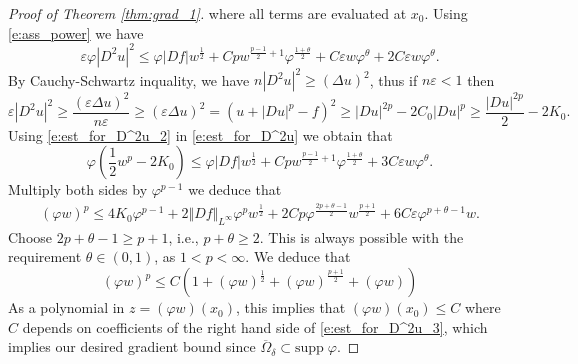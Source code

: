 \documentclass[11pt,reqno]{amsart}
\numberwithin{figure}{section}
\theoremstyle{plain}
\theoremstyle{remark}
\numberwithin{equation}{section}
\begin{document}
\begin{appendices}
\begin{proof}[Proof of Theorem \ref{thm:grad_1}]
where all terms are evaluated at $x_0$. Using \eqref{e:ass_power} we have
\begin{equation}\label{e:est_for_D^2u}
    \varepsilon \varphi|D^2u|^2 \leq  \varphi |Df|w^{\frac{1}{2}}+ Cp w^{\frac{p-1}{2}+1} \varphi^{\frac{1+\theta}{2}} + C\varepsilon w \varphi^{\theta} + 2C\varepsilon  w\varphi^\theta.
\end{equation}
By Cauchy-Schwartz inquality, we have $n|D^2u|^2\geq (\Delta u)^2$, thus if $n\varepsilon < 1$ then
\begin{equation}\label{e:est_for_D^2u_2}
    \varepsilon |D^2u|^2 \geq \frac{(\varepsilon \Delta u)^2}{n\varepsilon} \geq (\varepsilon \Delta u)^2 = \left(  u + |Du|^p - f\right)^2 \geq |Du|^{2p} - 2C_0|Du|^p \geq \frac{|Du|^{2p}}{2} - 2K_0.
\end{equation}
Using \eqref{e:est_for_D^2u_2} in \eqref{e:est_for_D^2u} we obtain that
\begin{equation*}
    \varphi\left(\frac{1}{2}w^p - 2K_0\right) \leq \varphi |Df|w^{\frac{1}{2}}+ Cp w^{\frac{p-1}{2}+1} \varphi^{\frac{1+\theta}{2}} + 3C\varepsilon w \varphi^{\theta}.
\end{equation*}
Multiply both sides by $\varphi^{p-1}$ we deduce that
\begin{align*}
    (\varphi w)^p \leq 4K_0\varphi^{p-1} + 2\Vert Df\Vert_{L^\infty}\varphi^p w^{\frac{1}{2}} + 2Cp \varphi^{\frac{2p+\theta - 1}{2}}w^{\frac{p+1}{2}} + 6C\varepsilon \varphi^{p+\theta - 1}w.
\end{align*}
Choose $2p+\theta -1 \geq p+1$, i.e., $p+\theta\geq 2$. This is always possible with the requirement $\theta \in (0,1)$, as $1<p <\infty$. We deduce that 
\begin{equation}\label{e:est_for_D^2u_3}
    (\varphi w)^p \leq C\left(1+ (\varphi w)^\frac{1}{2} + (\varphi w)^\frac{p+1}{2} +(\varphi w)\right)
\end{equation}
As a polynomial in $z = (\varphi w)(x_0)$, this implies that $(\varphi w)(x_0)\leq C$ where $C$ depends on coefficients of the right hand side of \eqref{e:est_for_D^2u_3}, which implies our desired gradient bound since $\overline{\Omega}_\delta\subset \mathrm{supp}\;\varphi$.
\end{proof}




\end{appendices}
\end{document}
